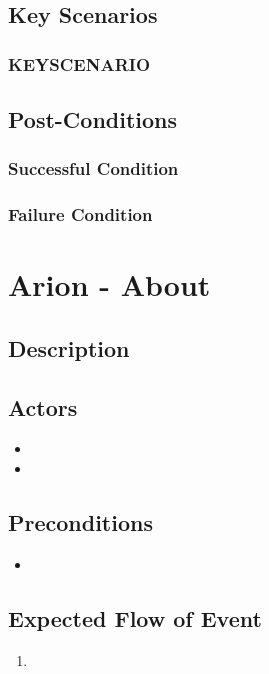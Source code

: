 \documentclass{scrreprt}
\begin{document}
\section{Key Scenarios}
    \subsection{KEYSCENARIO}

\section{Post-Conditions}
    \subsection{Successful Condition}
    
    \subsection{Failure Condition}


\chapter{Arion - About}

\section{Description}

\section{Actors}
\begin{itemize}
    \item 
    \item 
\end{itemize}

\section{Preconditions}
\begin{itemize}
    \item 
\end{itemize}

\section{Expected Flow of Event}
\begin{enumerate}[1.]
    \item 
\end{enumerate}
\end{document}
